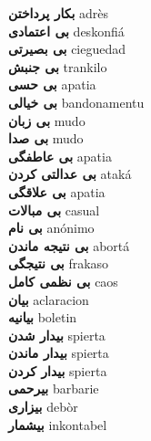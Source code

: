 \textbf{ بکار پرداختن  } adrès \\
\textbf{ بی اعتمادی  } deskonfiá \\
\textbf{ بی بصیرتی  } cieguedad \\
\textbf{ بی جنبش  } trankilo \\
\textbf{ بی حسی  } apatia \\
\textbf{ بی خیالی  } bandonamentu \\
\textbf{ بی زبان  } mudo \\
\textbf{ بی صدا  } mudo \\
\textbf{ بی عاطفگی  } apatia \\
\textbf{ بی عدالتی کردن  } ataká \\
\textbf{ بی علاقگی  } apatia \\
\textbf{ بی مبالات  } casual \\
\textbf{ بی نام  } anónimo \\
\textbf{ بی نتیجه ماندن  } abortá \\
\textbf{ بی نتیجگی  } frakaso \\
\textbf{ بی نظمی کامل  } caos \\
\textbf{ بیان  } aclaracion \\
\textbf{ بیانیه  } boletin \\
\textbf{ بیدار شدن  } spierta \\
\textbf{ بیدار ماندن  } spierta \\
\textbf{ بیدار کردن  } spierta \\
\textbf{ بیرحمی  } barbarie \\
\textbf{ بیزاری  } debòr \\
\textbf{ بیشمار  } inkontabel \\
